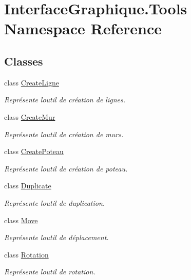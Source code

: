 \hypertarget{namespace_interface_graphique_1_1_tools}{}\section{Interface\+Graphique.\+Tools Namespace Reference}
\label{namespace_interface_graphique_1_1_tools}
\subsection*{Classes}
\begin{DoxyCompactItemize}
\item 
class \hyperlink{class_interface_graphique_1_1_tools_1_1_create_ligne}{Create\+Ligne}
\begin{DoxyCompactList}\small\item\em Représente l\textquotesingle{}outil de création de lignes. \end{DoxyCompactList}\item 
class \hyperlink{class_interface_graphique_1_1_tools_1_1_create_mur}{Create\+Mur}
\begin{DoxyCompactList}\small\item\em Représente l\textquotesingle{}outil de création de murs. \end{DoxyCompactList}\item 
class \hyperlink{class_interface_graphique_1_1_tools_1_1_create_poteau}{Create\+Poteau}
\begin{DoxyCompactList}\small\item\em Représente l\textquotesingle{}outil de création de poteau. \end{DoxyCompactList}\item 
class \hyperlink{class_interface_graphique_1_1_tools_1_1_duplicate}{Duplicate}
\begin{DoxyCompactList}\small\item\em Représente l\textquotesingle{}outil de duplication. \end{DoxyCompactList}\item 
class \hyperlink{class_interface_graphique_1_1_tools_1_1_move}{Move}
\begin{DoxyCompactList}\small\item\em Représente l\textquotesingle{}outil de déplacement. \end{DoxyCompactList}\item 
class \hyperlink{class_interface_graphique_1_1_tools_1_1_rotation}{Rotation}
\begin{DoxyCompactList}\small\item\em Représente l\textquotesingle{}outil de rotation. \end{DoxyCompactList}\item 

\end{DoxyCompactItemize}
